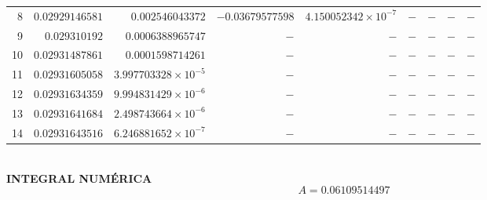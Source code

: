 \documentclass{article}
\begin{document}
\begin{table}[htpb]
\begin{tabular}{r r r r r r r r r}
8 & $0.02929146581$ & $0.002546043372$ & $-0.03679577598$ & $4.150052342 \times 10^{-7}$ & $-$ & $-$ & $-$ & $-$ \\
9 & $0.029310192$ & $0.0006388965747$ & $-$ & $-$ & $-$ & $-$ & $-$ & $-$ \\
10 & $0.02931487861$ & $0.0001598714261$ & $-$ & $-$ & $-$ & $-$ & $-$ & $-$ \\
11 & $0.02931605058$ & $3.997703328 \times 10^{-5}$ & $-$ & $-$ & $-$ & $-$ & $-$ & $-$ \\
12 & $0.02931634359$ & $9.994831429 \times 10^{-6}$ & $-$ & $-$ & $-$ & $-$ & $-$ & $-$ \\
13 & $0.02931641684$ & $2.498743664 \times 10^{-6}$ & $-$ & $-$ & $-$ & $-$ & $-$ & $-$ \\
14 & $0.02931643516$ & $6.246881652 \times 10^{-7}$ & $-$ & $-$ & $-$ & $-$ & $-$ & $-$ \\
\bottomrule\end{tabular}
\end{table} \\

\noindent \textbf{INTEGRAL NUMÉRICA}
$$
A = 0.06109514497
$$ \\
\end{document}
